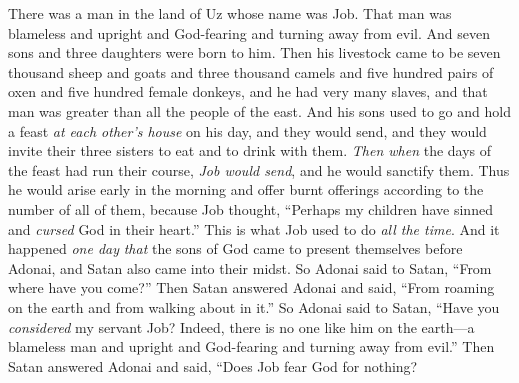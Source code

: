 
\begin{biblechapter} %
 There was a man in the land of Uz whose name was Job. That man was blameless and upright and God-fearing and turning away from evil.
\verse And seven sons and three daughters were born to him.
\verse Then his livestock came to be seven thousand sheep and goats and three thousand camels and five hundred pairs of oxen and five hundred female donkeys, and he had very many slaves, and that man was greater than all the people of the east.
\verse And his sons used to go and hold a feast \textit{at each other’s house} on his day, and they would send, and they would invite their three sisters to eat and to drink with them.
\verse \textit{Then when} the days of the feast had run their course, \textit{Job would send}, and he would sanctify them. Thus he would arise early in the morning and offer burnt offerings according to the number of all of them, because Job thought, “Perhaps my children have sinned and \textit{cursed} God in their heart.” This is what Job used to do \textit{all the time}.
\verse And it happened \textit{one day} \textit{that} the sons of God came to present themselves before Adonai, and Satan also came into their midst.
\verse So Adonai said to Satan, “From where have you come?” Then Satan answered Adonai and said, “From roaming on the earth and from walking about in it.”
\verse So Adonai said to Satan, “Have you \textit{considered} my servant Job? Indeed, there is no one like him on the earth—a blameless man and upright and God-fearing and turning away from evil.”
\verse Then Satan answered Adonai and said, “Does Job fear God for nothing?

\end{biblechapter}
